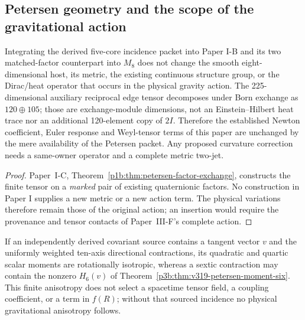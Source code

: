 \documentclass[12pt,a4paper]{article}
\begin{document}
\subsection{Petersen geometry and the scope of the gravitational action}
\label{p3e:sec:v319-petersen-gravity}
\begin{proposition}
\label{p3e:prop:v319-petersen-gravity-firewall}
Integrating the derived five-core incidence packet into Paper I-B and
its two matched-factor counterpart into $M_8$ does not change the
smooth eight-dimensional host, its metric, the existing continuous
structure group, or the Dirac/heat operator that occurs in the
physical gravity action.  The 225-dimensional auxiliary reciprocal
edge tensor decomposes under Born exchange as $120\oplus105$; those
are exchange-module dimensions, not an Einstein--Hilbert heat trace
nor an additional 120-element copy of $2I$.
Therefore the established Newton coefficient, Euler response and
Weyl-tensor terms of this paper are unchanged by the mere availability
of the Petersen packet.  Any proposed curvature correction needs a
same-owner operator and a complete metric two-jet.
\end{proposition}
\begin{proof}
Paper~I-C, Theorem~\ref{p1b:thm:petersen-factor-exchange},
constructs the finite tensor on a \emph{marked} pair of existing
quaternionic factors.  No construction in Paper I supplies a new
metric or a new action term.  The physical variations therefore
remain those of the original action; an insertion would require the
provenance and tensor contacts of Paper~III-F's complete action.
\end{proof}

\begin{remark}
If an independently derived covariant source contains a tangent vector
$v$ and the uniformly weighted ten-axis directional contractions,
its quadratic and quartic scalar moments are rotationally isotropic,
whereas a sextic contraction may contain the nonzero $H_6(v)$ of
Theorem~\ref{p3b:thm:v319-petersen-moment-six}.  This finite
anisotropy does not select a spacetime tensor field, a coupling
coefficient, or a term in $f(R)$; without that sourced incidence no
physical gravitational anisotropy follows.
\end{remark}
\end{document}
